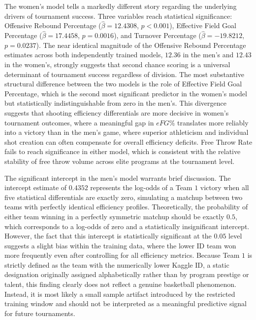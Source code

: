 \documentclass[12pt,leqno]{article}\usepackage[pdftex]{graphicx}\usepackage[dvipsnames]{xcolor}
\theoremstyle{remark}
\begin{document}
The women's model tells a markedly different story regarding the underlying drivers of tournament success. Three variables reach statistical significance: Offensive Rebound Percentage ($\hat{\beta} = 12.4308$, $p < 0.001$), Effective Field Goal Percentage ($\hat{\beta} = 17.4458$, $p = 0.0016$), and Turnover Percentage ($\hat{\beta} = -19.8212$, $p = 0.0237$). The near identical magnitude of the Offensive Rebound Percentage estimates across both independently trained models, $12.36$ in the men's and $12.43$ in the women's, strongly suggests that second chance scoring is a universal determinant of tournament success regardless of division. The most substantive structural difference between the two models is the role of Effective Field Goal Percentage, which is the second most significant predictor in the women's model but statistically indistinguishable from zero in the men's. This divergence suggests that shooting efficiency differentials are more decisive in women's tournament outcomes, where a meaningful gap in $eFG\%$ translates more reliably into a victory than in the men's game, where superior athleticism and individual shot creation can often compensate for overall efficiency deficits. Free Throw Rate fails to reach significance in either model, which is consistent with the relative stability of free throw volume across elite programs at the tournament level.

The significant intercept in the men's model warrants brief discussion. The intercept estimate of $0.4352$ represents the log-odds of a Team $1$ victory when all five statistical differentials are exactly zero, simulating a matchup between two teams with perfectly identical efficiency profiles. Theoretically, the probability of either team winning in a perfectly symmetric matchup should be exactly $0.5$, which corresponds to a log-odds of zero and a statistically insignificant intercept. However, the fact that this intercept is statistically significant at the $0.05$ level suggests a slight bias within the training data, where the lower ID team won more frequently even after controlling for all efficiency metrics. Because Team $1$ is strictly defined as the team with the numerically lower Kaggle ID, a static designation originally assigned alphabetically rather than by program prestige or talent, this finding clearly does not reflect a genuine basketball phenomenon. Instead, it is most likely a small sample artifact introduced by the restricted training window and should not be interpreted as a meaningful predictive signal for future tournaments.
\end{document}
